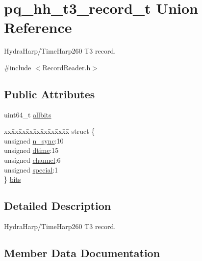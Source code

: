 \hypertarget{unionpq__hh__t3__record__t}{}\section{pq\+\_\+hh\+\_\+t3\+\_\+record\+\_\+t Union Reference}
\label{unionpq__hh__t3__record__t}


Hydra\+Harp/\+Time\+Harp260 T3 record.  




{\ttfamily \#include $<$Record\+Reader.\+h$>$}

\subsection*{Public Attributes}
\begin{DoxyCompactItemize}
\item 
uint64\+\_\+t \hyperlink{unionpq__hh__t3__record__t_a7c19c5bdd8be57b851744afa3ee5560b}{allbits}
\item 
\begin{tabbing}
xx\=xx\=xx\=xx\=xx\=xx\=xx\=xx\=xx\=\kill
struct \{\\
\>unsigned \hyperlink{unionpq__hh__t3__record__t_abb244c46493f88b25bddd2720d8db775}{n\_sync}:10\\
\>unsigned \hyperlink{unionpq__hh__t3__record__t_adf08c8dc759cb14e16ac7ac17f2891de}{dtime}:15\\
\>unsigned \hyperlink{unionpq__hh__t3__record__t_a93243944e4b4197d80c1ba9540fca8f2}{channel}:6\\
\>unsigned \hyperlink{unionpq__hh__t3__record__t_ae5a00d94ca6826e4a9825793cd646b7b}{special}:1\\
\} \hyperlink{unionpq__hh__t3__record__t_ab34dd4f4cc6edf9d1136155e07fb847c}{bits}\\

\end{tabbing}\end{DoxyCompactItemize}


\subsection{Detailed Description}
Hydra\+Harp/\+Time\+Harp260 T3 record. 

\subsection{Member Data Documentation}
\mbox{\label{unionpq__hh__t3__record__t_a7c19c5bdd8be57b851744afa3ee5560b}} 
